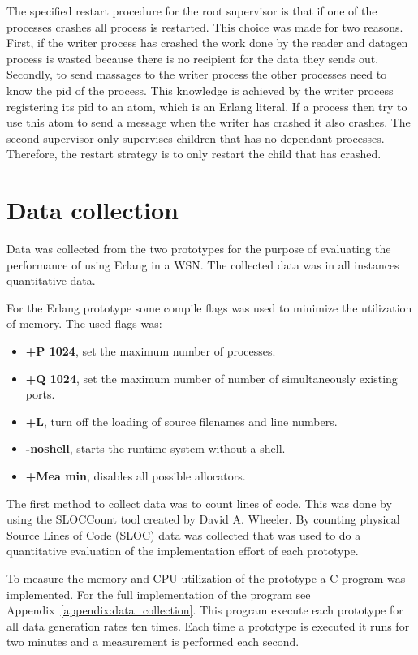 The specified restart procedure for the root supervisor is that if one of the processes crashes all process is restarted. This choice was made for two reasons. First, if the writer process has crashed the work done by the reader and datagen process is wasted because there is no recipient for the data they sends out. Secondly, to send massages to the writer process the other processes need to know the pid of the process. This knowledge is achieved by the writer process registering its pid to an atom, which is an Erlang literal. If a process then try to use this atom to send a message when the writer has crashed it also crashes. The second supervisor only supervises children that has no dependant processes. Therefore, the restart strategy is to only restart the child that has crashed. 

\section{Data collection}\label{sec:data_collection}
Data was collected from the two prototypes for the purpose of evaluating the performance of using Erlang in a WSN. The collected data was in all instances quantitative data.

For the Erlang prototype some compile flags was used to minimize the utilization of memory. The used flags was:

\begin{itemize}
    \item \textbf{+P 1024}, set the maximum number of processes.
    \item \textbf{+Q 1024}, set the maximum number of number of simultaneously existing ports. 
    \item \textbf{+L}, turn off the loading of source filenames and line numbers.
    \item \textbf{-noshell}, starts the runtime system without a shell.
    \item \textbf{+Mea min}, disables all possible allocators.
\end{itemize}

The first method to collect data was to count lines of code. This was done by using the SLOCCount tool created by David A. Wheeler. By counting physical Source Lines of Code (SLOC) data was collected that was used to do a quantitative evaluation of the implementation effort of each prototype.

To measure the memory and CPU utilization of the prototype a C program was implemented. For the full implementation of the program see Appendix~\ref{appendix:data_collection}. This program execute each prototype for all data generation rates ten times. Each time a prototype is executed it runs for two minutes and a measurement is performed each second. 

